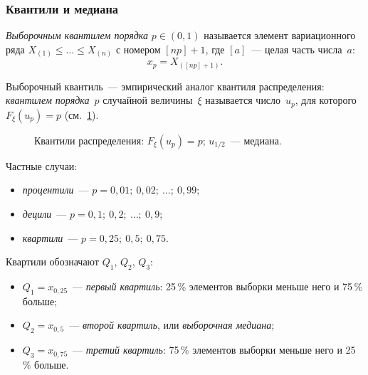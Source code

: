 \subsubsection{Квантили и медиана}

\begin{definition}
  \emph{Выборочным квантилем порядка} $p \in (0, 1)$ называется элемент
  вариационного ряда $X_{(1)} \le \ldots \le X_{(n)}$ с номером $[np] + 1$,
  где $[a]$~--- целая часть числа~$a$:
  \[
    x_p = X_{([np] + 1)}.
  \]
\end{definition}

Выборочный квантиль~--- эмпирический аналог квантиля распределения:
\emph{квантилем порядка}~$p$ случайной величины~$\xi$ называется число~$u_p$,
для которого $F_\xi(u_p) = p$ (см.~\cref{lec03:fig:quantile}).

\begin{figure}[h]
  \centering
  \caption{Квантили распределения: $F_\xi(u_p) = p$; $u_{1/2}$~--- медиана.}
  \label{lec03:fig:quantile}
\end{figure}

Частные случаи:
\begin{itemize}
  \item \emph{процентили}~--- $p = 0{,}01;\ 0{,}02;\ \ldots;\ 0{,}99$;
  \item \emph{децили}~--- $p = 0{,}1;\ 0{,}2;\ \ldots;\ 0{,}9$;
  \item \emph{квартили}~--- $p = 0{,}25;\ 0{,}5;\ 0{,}75$.
\end{itemize}

Квартили обозначают $Q_1$, $Q_2$, $Q_3$:
\begin{itemize}
  \item $Q_1 = x_{0{,}25}$~--- \emph{первый квартиль}: 25\,\% элементов
        выборки меньше него и 75\,\% больше;
  \item $Q_2 = x_{0{,}5}$~--- \emph{второй квартиль}, или \emph{выборочная медиана};
  \item $Q_3 = x_{0{,}75}$~--- \emph{третий квартиль}: 75\,\% элементов
        выборки меньше него и 25\,\% больше.
\end{itemize}

